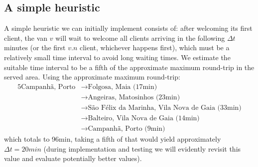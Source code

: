 \subsection{A simple heuristic} \label{algorithm-vrp-heuristic}
A simple heuristic we can initially implement consists of: after welcoming its first client, the van $v$ will wait to welcome all clients arriving in the following $\Delta t$ minutes (or the first $v.n$ client, whichever happens first), which must be a relatively small time interval to avoid long waiting times. We estimate the suitable time interval to be a fifth of the approximate maximum round-trip in the served area. Using the approximate maximum round-trip:
\begin{alignat*}{5}
    \text{Campanhã, Porto}
    &\rightarrow \text{Folgosa, Maia (17min)} \\
    &\rightarrow\text{Angeiras, Matosinhos (23min)} \\
    &\rightarrow\text{São Félix da Marinha, Vila Nova de Gaia (33min)} \\
    &\rightarrow\text{Balteiro, Vila Nova de Gaia (14min)} \\
    &\rightarrow\text{Campanhã, Porto (9min)}
\end{alignat*}
which totals to 96min, taking a fifth of that would yield approximately $\Delta t = 20min$ (during implementation and testing we will evidently revisit this value and evaluate potentially better values).
